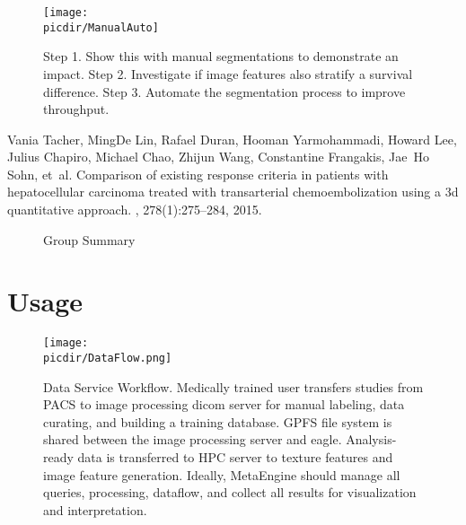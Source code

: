 \documentclass[10pt]{amsart}
\newcommand{\picdir}{./pdffig}
\begin{document}
\begin{figure}[h]
\texttt{[image: \\picdir/ManualAuto]}
\caption{
  Step 1. Show this with manual segmentations to demonstrate an impact.
  Step 2. Investigate if image features also stratify a survival difference.
  Step 3. Automate the segmentation process to improve throughput.
}\label{Fig:ManualAuto}
\end{figure}


\begin{thebibliography}{1}
Vania Tacher, MingDe Lin, Rafael Duran, Hooman Yarmohammadi, Howard Lee,
Julius
  Chapiro, Michael Chao, Zhijun Wang, Constantine Frangakis, Jae~Ho Sohn,
  et~al.
\newblock Comparison of existing response criteria in patients with
  hepatocellular carcinoma treated with transarterial chemoembolization
using a
  3d quantitative approach.
, 278(1):275--284, 2015.

\end{thebibliography}

\clearpage
\pagebreak


\begin{figure}[h]
   \caption{Group Summary}\label{fig:GroupSummary}
\end{figure}
        

\clearpage
\pagebreak

\section{Usage}
\begin{figure}[h]
\texttt{[image: \\picdir/DataFlow.png]}
\caption{
Data Service Workflow.
Medically trained user transfers studies from PACS to image 
processing dicom server for manual labeling, data curating, and building a training database.
GPFS file system is shared between the image processing server and eagle.
Analysis-ready data is transferred to HPC server to texture features and image feature generation.
Ideally, MetaEngine should manage all queries, processing, dataflow, 
and collect all results for visualization and interpretation.
}\label{Fig:DataFlow}
\end{figure}
\end{document}
